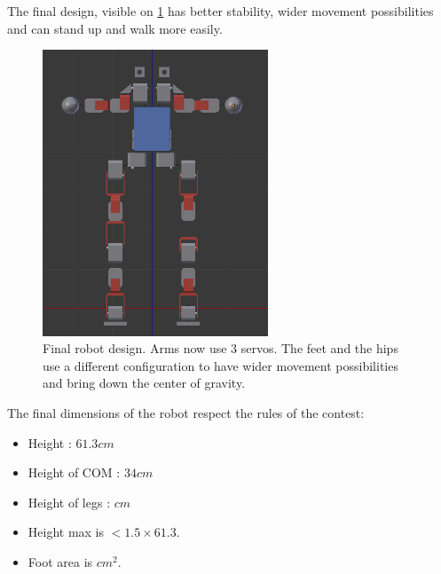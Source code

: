 The final design, visible on \cref{fig:final_robot} has better stability, wider movement possibilities and can stand up and walk more easily. 
\begin{figure}[htp]
\center
\includegraphics[width=0.6\textwidth]{figures/robot2}
\caption[Final robot design]{Final robot design. Arms now use 3 servos. The feet and the hips use a different configuration to have wider movement possibilities and bring down the center of gravity.}
\label{fig:final_robot}
\end{figure}

The final dimensions of the robot respect the rules of the contest:
\begin{itemize}
\item Height : $61.3cm$
\item Height of COM : $34cm$
\item Height of legs : $cm$
\item Height max is $< 1.5 \times 61.3$.
\item Foot area is $ cm^2$.
\end{itemize}